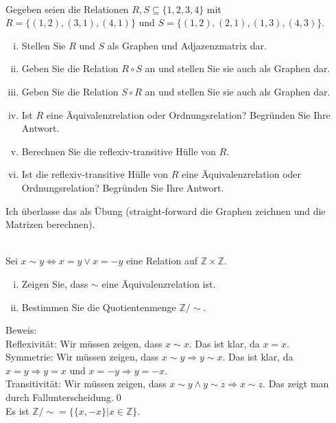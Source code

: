 \\
Gegeben seien die Relationen $R,S\subseteq\{1,2,3,4\}$ mit $R=\{(1,2),(3,1),(4,1)\}$ und $S=\{(1,2),(2,1),(1,3),(4,3)\}$.
\begin{enumerate}[(i)]
    \item Stellen Sie $R$ und $S$ als Graphen und Adjazenzmatrix dar.
    \item Geben Sie die Relation $R\circ S$ an und stellen Sie sie auch als Graphen dar.
    \item Geben Sie die Relation $S\circ R$ an und stellen Sie sie auch als Graphen dar.
    \item Ist $R$ eine Äquivalenzrelation oder Ordnungsrelation? Begründen Sie Ihre Antwort.
    \item Berechnen Sie die reflexiv-transitive Hülle von $R$.
    \item Ist die reflexiv-transitive Hülle von $R$ eine Äquivalenzrelation oder Ordnungsrelation? Begründen Sie Ihre Antwort.

\end{enumerate}
\begin{loesung}
    Ich überlasse das als Übung (straight-forward die Graphen zeichnen und die Matrizen berechnen).
\end{loesung}

\\
Sei $x\sim y\Leftrightarrow x=y \vee x=-y$ eine Relation auf $\mathbb{Z}\times\mathbb{Z}$. 
\begin{enumerate}[(i)]
    \item Zeigen Sie, dass $\sim$ eine Äquivalenzrelation ist.
    \item Bestimmen Sie die Quotientenmenge $\mathbb{Z}/\sim$.
\end{enumerate}
\begin{loesung}
Beweis:\\
Reflexivität: Wir müssen zeigen, dass $x\sim x$. Das ist klar, da $x=x$.\\
Symmetrie: Wir müssen zeigen, dass $x\sim y\Rightarrow y\sim x$. Das ist klar, da $x=y\Rightarrow y=x$ und $x=-y\Rightarrow y=-x$.\\
Transitivität: Wir müssen zeigen, dass $x\sim y\wedge y\sim z\Rightarrow x\sim z$. Das zeigt man durch Fallunterscheidung.\qed\\
Es ist $\mathbb{Z}/\sim=\{\{x,-x\}|x\in\mathbb{Z}\}$.
\end{loesung}

